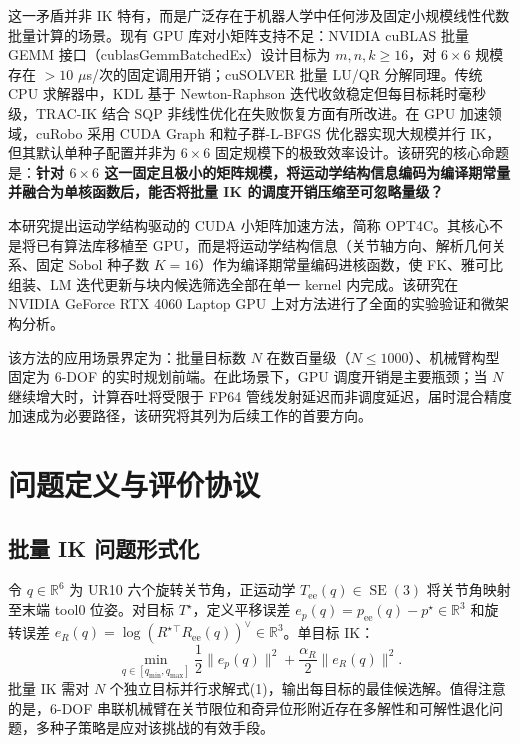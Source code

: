 \documentclass[twocolumn,a4paper,10pt]{ctexart}
\DeclareMathOperator{\SE}{SE}
\newcommand{\R}{\mathbb{R}}
\begin{document}
这一矛盾并非 IK 特有，而是广泛存在于机器人学中任何涉及固定小规模线性代数批量计算的场景。现有 GPU 库对小矩阵支持不足：NVIDIA cuBLAS 批量 GEMM 接口（cublasGemmBatchedEx）设计目标为 $m,n,k\ge16$，对 $6\times6$ 规模存在 $>10$ $\mu$s/次的固定调用开销；cuSOLVER 批量 LU/QR 分解同理\cite{cuda}。传统 CPU 求解器中，KDL\cite{kdl} 基于 Newton-Raphson 迭代收敛稳定但每目标耗时毫秒级，TRAC-IK\cite{tracik} 结合 SQP 非线性优化在失败恢复方面有所改进。在 GPU 加速领域，cuRobo\cite{curobo} 采用 CUDA Graph 和粒子群-L-BFGS 优化器实现大规模并行 IK，但其默认单种子配置并非为 $6\times6$ 固定规模下的极致效率设计。该研究的核心命题是：\textbf{针对 $6\times6$ 这一固定且极小的矩阵规模，将运动学结构信息编码为编译期常量并融合为单核函数后，能否将批量 IK 的调度开销压缩至可忽略量级？}

本研究提出运动学结构驱动的 CUDA 小矩阵加速方法，简称 OPT4C。其核心不是将已有算法库移植至 GPU，而是将运动学结构信息（关节轴方向、解析几何关系、固定 Sobol 种子数 $K=16$）作为编译期常量编码进核函数，使 FK、雅可比组装、LM 迭代更新与块内候选筛选全部在单一 kernel 内完成。该研究在 NVIDIA GeForce RTX 4060 Laptop GPU 上对方法进行了全面的实验验证和微架构分析。

该方法的应用场景界定为：批量目标数 $N$ 在数百量级（$N\le1000$）、机械臂构型固定为 6-DOF 的实时规划前端。在此场景下，GPU 调度开销是主要瓶颈；当 $N$ 继续增大时，计算吞吐将受限于 FP64 管线发射延迟而非调度延迟，届时混合精度加速成为必要路径，该研究将其列为后续工作的首要方向。

\section{问题定义与评价协议}

\subsection{批量 IK 问题形式化}

令 $q\in\R^6$ 为 UR10 六个旋转关节角，正运动学 $T_{\mathrm{ee}}(q)\in\SE(3)$ 将关节角映射至末端 tool0 位姿。对目标 $T^\star$，定义平移误差 $e_p(q)=p_{\mathrm{ee}}(q)-p^\star\in\R^3$ 和旋转误差 $e_R(q)=\log(R^\star{}^\top R_{\mathrm{ee}}(q))^\vee\in\R^3$。单目标 IK：
\begin{equation}
\min_{q\in[q_{\min},q_{\max}]}\frac{1}{2}\|e_p(q)\|^2+\frac{\alpha_R}{2}\|e_R(q)\|^2.
\end{equation}
批量 IK 需对 $N$ 个独立目标并行求解式(1)，输出每目标的最佳候选解。值得注意的是，6-DOF 串联机械臂在关节限位和奇异位形附近存在多解性和可解性退化问题\cite{nakamura1986ik}，多种子策略是应对该挑战的有效手段。
\end{document}
